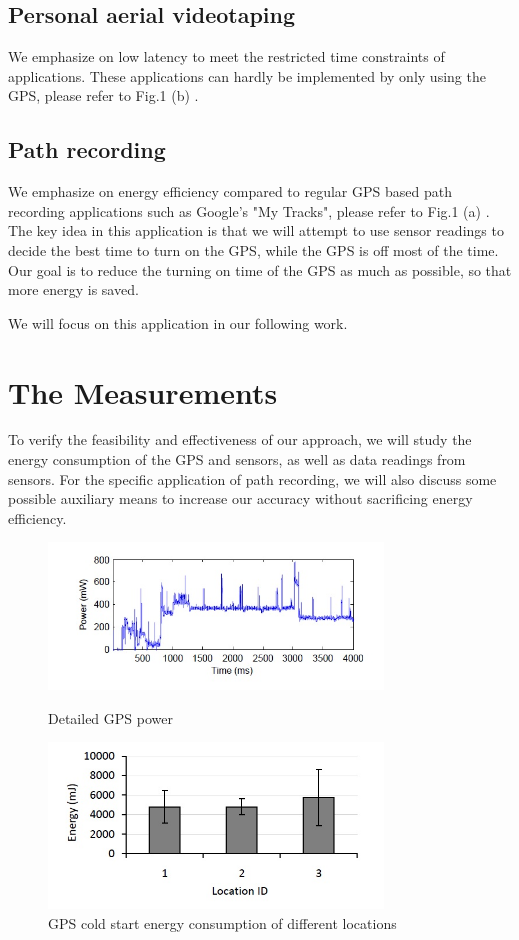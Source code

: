 \documentclass[journal]{IEEEtran}
\begin{document}
\subsection{Personal aerial videotaping}
We emphasize on low latency to meet the restricted time constraints of applications. These applications can hardly be implemented by only using the GPS, please refer to Fig.1 (b) .

\subsection{Path recording}
We emphasize on energy efficiency compared to regular GPS based path recording applications such as Google's "My Tracks", please refer to Fig.1 (a) . 
The key idea in this application is that we will attempt to use sensor readings to decide the best time to turn on the GPS, while the GPS is off most of the time.
Our goal is to reduce the turning on time of the GPS as much as possible, so that more energy is saved. 

We will focus on this application in our following work. 

\section{The Measurements}
To verify the feasibility and effectiveness of our approach, we will study the energy consumption of the GPS and sensors, as well as data readings from sensors.
For the specific application of path recording, we will also discuss some possible auxiliary means to increase our accuracy without sacrificing energy efficiency.

\begin{figure}
	\centering
	\includegraphics[width=3.5in]{figures/dpower}
	\caption{Detailed GPS power \cite{GPS Measurements} }
	\includegraphics[width=3.5in]{figures/csenergy}
	\caption{GPS cold start energy consumption of different locations \cite{GPS Measurements} }
\end{figure}
\end{document}
